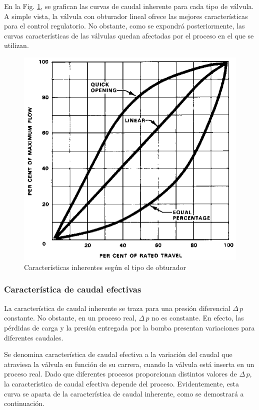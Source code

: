 En la Fig. \ref{fig:caractInherente}, se grafican las curvas de caudal
inherente para cada tipo de válvula.
A simple vista, la válvula con obturador lineal ofrece las mejores
características para el control regulatorio.
No obstante, como se expondrá posteriormente, las curvas características de las
válvulas quedan afectadas por el proceso en el que se utilizan.

\begin{figure}[t]
 \centering
 \includegraphics[scale=1.43]{Cap2-DisenoEnsamblado/images/Inherente.png}
 \caption{Características inherentes según el tipo de obturador}
 \label{fig:caractInherente}
\end{figure}


\subsubsection{Característica de caudal efectivas}

La característica de caudal inherente se traza para una presión diferencial
$\Delta \,p$ constante.
No obstante, en un proceso real, $\Delta \,p$ no es constante.
En efecto, las pérdidas de carga y la presión entregada por la bomba presentan
variaciones para diferentes caudales.

Se denomina característica de caudal efectiva a la variación del
caudal que atraviesa la válvula en función de su carrera, cuando la
válvula está inserta en un proceso real.
Dado que diferentes procesos proporcionan distintos valores de  $\Delta
\,p$, la característica de caudal efectiva depende del proceso.
Evidentemente, esta curva se aparta de la característica de caudal inherente,
como se demostrará a continuación.

